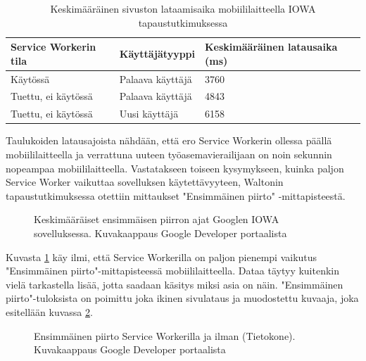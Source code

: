 \documentclass{tktltiki}
\begin{document}
\begin{table}[h]
\centering
\begin{small}
\caption{Keskimääräinen sivuston lataamisaika mobiililaitteella IOWA tapaustutkimuksessa \cite{Walton} }
\begin{tabular}{|L{5cm}|L{4cm}|L{4cm}|}
\hline
\textbf{Service Workerin tila} & 
\textbf{Käyttäjätyyppi} &
\textbf{Keskimääräinen latausaika (ms)}
\\ \hline
Käytössä & 
Palaava käyttäjä &
3760
\\ \hline
Tuettu, ei käytössä & 
Palaava käyttäjä &
4843
\\ \hline
Tuettu, ei käytössä & 
Uusi käyttäjä &
6158
\\ \hline
\end{tabular}
\label{table:loading time on mobile}
\end{small}
\end{table}

Taulukoiden latausajoista nähdään, että ero Service Workerin ollessa päällä mobiililaitteella ja verrattuna uuteen työasemavierailijaan on noin sekunnin nopeampaa mobiililaitteella. Vastatakseen toiseen kysymykseen, kuinka paljon Service Worker vaikuttaa sovelluksen käytettävyyteen, Waltonin \cite{Walton} tapaustutkimuksessa otettiin mittaukset "Ensimmäinen piirto" -mittapisteestä.

\begin{figure}[h]
\begin{center}
\caption{Keskimääräiset ensimmäisen piirron ajat Googlen IOWA sovelluksessa. Kuvakaappaus Google Developer portaalista \cite{Walton}}
\label{Google AVG load times 1}
\end{center}
\end{figure}

Kuvasta \ref{Google AVG load times 1} käy ilmi, että Service Workerilla on paljon pienempi vaikutus "Ensimmäinen piirto"-mittapisteessä mobiililaitteella. Dataa täytyy kuitenkin vielä tarkastella lisää, jotta saadaan käsitys miksi asia on näin. "Ensimmäinen piirto"-tuloksista on poimittu joka ikinen sivulataus ja muodostettu kuvaaja, joka esitellään kuvassa \ref{Google AVG load times 2}.

\begin{figure}[h]
\begin{center}
\caption{Ensimmäinen piirto Service Workerilla ja ilman (Tietokone). Kuvakaappaus Google Developer portaalista \cite{Walton}}
\label{Google AVG load times 2}
\end{center}
\end{figure}
\end{document}
